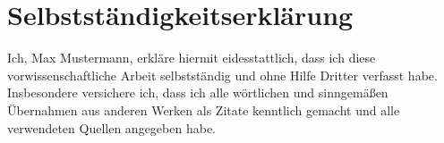 \documentclass[12pt, a4paper]{article}
\begin{document}
\clearpage
\thispagestyle{empty}
\section*{Selbstständigkeitserklärung}

Ich, Max Mustermann, erkläre hiermit eidesstattlich, dass ich diese vorwissenschaftliche Arbeit selbstständig und ohne Hilfe Dritter verfasst habe. Insbesondere versichere ich, dass ich alle wörtlichen und sinngemäßen Übernahmen aus anderen Werken als Zitate kenntlich gemacht und alle verwendeten Quellen angegeben habe.

\vspace{0.5cm}
\makebox[5cm]{\hrulefill} \hfill\makebox[5cm]{\hrulefill}
\par{} \hfill{}
\end{document}
